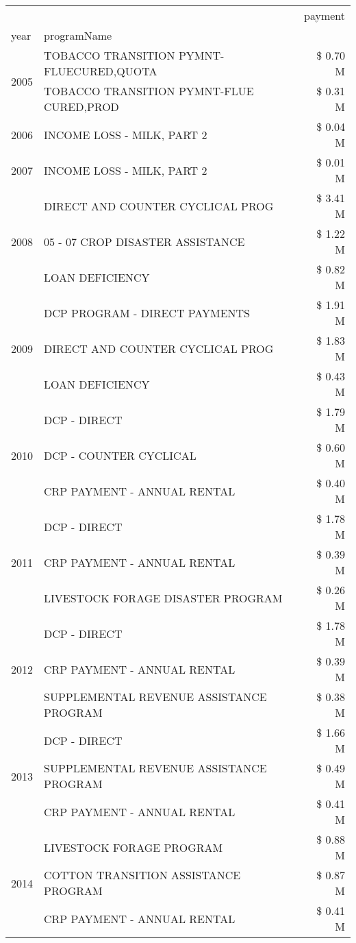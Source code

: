 \begin{tabular}{llr}
\toprule
 &  & payment \\
year & programName &  \\
\midrule
\multirow[t]{2}{*}{2005} & TOBACCO TRANSITION PYMNT-FLUECURED,QUOTA & \$ 0.70 M \\
 & TOBACCO TRANSITION PYMNT-FLUE CURED,PROD & \$ 0.31 M \\
\cline{1-3}
2006 & INCOME LOSS - MILK, PART 2 & \$ 0.04 M \\
\cline{1-3}
2007 & INCOME LOSS - MILK, PART 2 & \$ 0.01 M \\
\cline{1-3}
\multirow[t]{3}{*}{2008} & DIRECT AND COUNTER CYCLICAL PROG & \$ 3.41 M \\
 & 05 - 07 CROP DISASTER ASSISTANCE & \$ 1.22 M \\
 & LOAN DEFICIENCY & \$ 0.82 M \\
\cline{1-3}
\multirow[t]{3}{*}{2009} & DCP PROGRAM - DIRECT PAYMENTS & \$ 1.91 M \\
 & DIRECT AND COUNTER CYCLICAL PROG & \$ 1.83 M \\
 & LOAN DEFICIENCY & \$ 0.43 M \\
\cline{1-3}
\multirow[t]{3}{*}{2010} & DCP - DIRECT & \$ 1.79 M \\
 & DCP - COUNTER CYCLICAL & \$ 0.60 M \\
 & CRP PAYMENT - ANNUAL RENTAL & \$ 0.40 M \\
\cline{1-3}
\multirow[t]{3}{*}{2011} & DCP - DIRECT & \$ 1.78 M \\
 & CRP PAYMENT - ANNUAL RENTAL & \$ 0.39 M \\
 & LIVESTOCK FORAGE DISASTER PROGRAM & \$ 0.26 M \\
\cline{1-3}
\multirow[t]{3}{*}{2012} & DCP - DIRECT & \$ 1.78 M \\
 & CRP PAYMENT - ANNUAL RENTAL & \$ 0.39 M \\
 & SUPPLEMENTAL REVENUE ASSISTANCE PROGRAM & \$ 0.38 M \\
\cline{1-3}
\multirow[t]{3}{*}{2013} & DCP - DIRECT & \$ 1.66 M \\
 & SUPPLEMENTAL REVENUE ASSISTANCE PROGRAM & \$ 0.49 M \\
 & CRP PAYMENT - ANNUAL RENTAL & \$ 0.41 M \\
\cline{1-3}
\multirow[t]{3}{*}{2014} & LIVESTOCK FORAGE PROGRAM & \$ 0.88 M \\
 & COTTON TRANSITION ASSISTANCE PROGRAM & \$ 0.87 M \\
 & CRP PAYMENT - ANNUAL RENTAL & \$ 0.41 M \\

\end{tabular}
